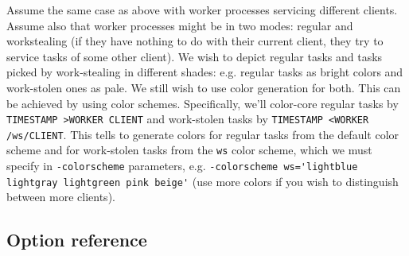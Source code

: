 \documentclass{article}
\begin{document}
Assume the same case as above with worker processes servicing different clients. Assume also that worker processes might be in two modes: regular and workstealing (if they have nothing to do with their current client, they try to service tasks of some other client). We wish to depict regular tasks and tasks picked by work-stealing in different shades: e.g. regular tasks as bright colors and work-stolen ones as pale. We still wish to use color generation for both. This can be achieved by using color schemes. Specifically, we'll color-core regular tasks by \verb|TIMESTAMP >WORKER CLIENT| and work-stolen tasks by \verb|TIMESTAMP <WORKER /ws/CLIENT|. This tells \splot{} to generate colors for regular tasks from the default color scheme and for work-stolen tasks from the \verb|ws| color scheme, which we must specify in \verb|-colorscheme| parameters, e.g. \verb|-colorscheme ws='lightblue lightgray lightgreen pink beige'| (use more colors if you wish to distinguish between more clients).


\subsection{Option reference}
\end{document}
